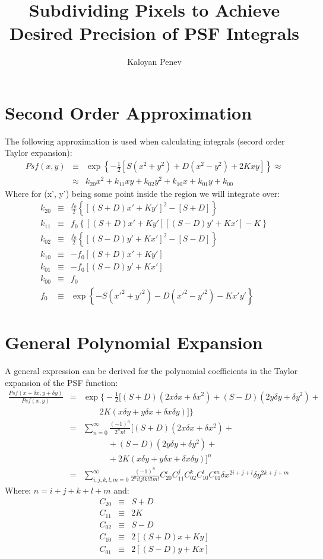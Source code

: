 \documentclass{article}
\author{Kaloyan Penev}
\title{Subdividing Pixels to Achieve Desired Precision of PSF Integrals}
\begin{document}
\section{Second Order Approximation}
The following approximation is used when calculating integrals 
(secord order Taylor expansion):
\begin{eqnarray}
	Psf(x,y)&\equiv&
	\exp\left\{-\frac{1}{2}\left[S(x^2+y^2)+D(x^2-y^2)+2Kxy\right]\right\}
	\approx\nonumber\\
	&\approx&
	k_{20}x^2 + k_{11}xy + k_{02}y^2 + k_{10}x + k_{01}y + k_{00}
\end{eqnarray}
Where for (x', y') being some point inside the region we will integrate over:
\begin{eqnarray}
	k_{20}&\equiv&\frac{f_0}{2}\left\{\left[(S+D)x' + Ky'\right]^2 -
		\left[S+D\right]\right\} \\
	k_{11}&\equiv&f_0\left\{\left[(S+D)x' + Ky'\right]
		\left[(S-D)y' + Kx'\right] - K\right\}\\
	k_{02}&\equiv&\frac{f_0}{2}\left\{\left[(S-D)y' + Kx'\right]^2 - 
		\left[S-D\right]\right\}\\
	k_{10}&\equiv&-f_0\left[(S+D)x' + Ky'\right]\\
	k_{01}&\equiv&-f_0\left[(S-D)y' + Kx'\right]\\
	k_{00}&\equiv&f_0\\
	f_0&\equiv&\exp\left\{-S(x'^2+y'^2)-D(x'^2-y'^2)-Kx'y'\right\}
\end{eqnarray}
\section{General Polynomial Expansion}
A general expression can be derived for the polynomial coefficients in the
Taylor expansion of the PSF function:
\begin{eqnarray}
	\frac{Psf(x+\delta x, y+\delta y)}{Psf(x,y)} &=&
		\exp\Bigg\{-\frac{1}{2}\Big[(S+D)(2x\delta x+\delta x^2)
		+(S-D)(2y\delta y + \delta y^2) + \nonumber\\
		&&\quad\quad 
		2K(x\delta y + y \delta x + \delta x\delta y)\Big]\Bigg\}\\
		&=&\sum_{n=0}^{\infty} \frac{(-1)^n}{2^n n!}
		\Big[
			(S+D)(2x\delta x+\delta x^2) + \nonumber\\
			&&\quad\quad\quad + (S-D)(2y\delta y+\delta y^2) + \nonumber\\
			&&\quad\quad\quad + 2K(x\delta y + y\delta x + \delta x\delta y)
		\Big]^n\\
		&=&\sum_{i,j,k,l,m=0}^{\infty} \frac{(-1)^n}{2^n i!j!k!l!m!}
		C_{20}^i C_{11}^j C_{02}^k C_{10}^l C_{01}^m 
		\delta x^{2i+j+l} \delta y^{2k+j+m}
		\label{eq: full expansion}
\end{eqnarray}
Where: $n=i+j+k+l+m$ and:
\begin{eqnarray}
	C_{20}&\equiv&S+D\\
	C_{11}&\equiv&2K\\
	C_{02}&\equiv&S-D\\
	C_{10}&\equiv&2\left[(S+D)x+Ky\right]\\
	C_{01}&\equiv&2\left[(S-D)y+Kx\right]
\end{eqnarray}
\end{document}
